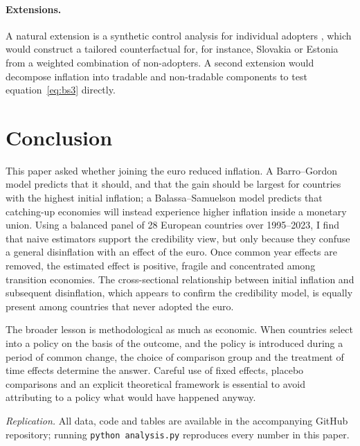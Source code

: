 \documentclass[11pt,a4paper]{article}
\numberwithin{equation}{section}
\theoremstyle{definition}
\theoremstyle{remark}
\begin{document}
\paragraph{Extensions.} A natural extension is a synthetic control analysis for individual adopters \citep{abadie2010}, which would construct a tailored counterfactual for, for instance, Slovakia or Estonia from a weighted combination of non-adopters. A second extension would decompose inflation into tradable and non-tradable components to test equation~\eqref{eq:bs3} directly.

\section{Conclusion}\label{sec:conclusion}

This paper asked whether joining the euro reduced inflation. A Barro--Gordon model predicts that it should, and that the gain should be largest for countries with the highest initial inflation; a Balassa--Samuelson model predicts that catching-up economies will instead experience higher inflation inside a monetary union. Using a balanced panel of 28 European countries over 1995--2023, I find that naive estimators support the credibility view, but only because they confuse a general disinflation with an effect of the euro. Once common year effects are removed, the estimated effect is positive, fragile and concentrated among transition economies. The cross-sectional relationship between initial inflation and subsequent disinflation, which appears to confirm the credibility model, is equally present among countries that never adopted the euro.

The broader lesson is methodological as much as economic. When countries select into a policy on the basis of the outcome, and the policy is introduced during a period of common change, the choice of comparison group and the treatment of time effects determine the answer. Careful use of fixed effects, placebo comparisons and an explicit theoretical framework is essential to avoid attributing to a policy what would have happened anyway.

\medskip
\noindent\textit{Replication.} All data, code and tables are available in the accompanying GitHub repository; running \texttt{python analysis.py} reproduces every number in this paper.
\end{document}
